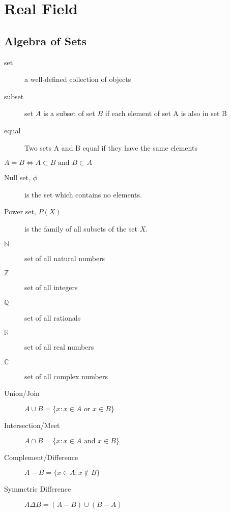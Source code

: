 \chapter{Real Field}
\section{Algebra of Sets}
	\begin{description}
		\item[set] a well-defined collection of objects
		\item[subset] set $A$ is a subset of set $B$ if each element of set A is also in set B
		\item[equal] Two sets A and B equal if they have the same elements
	\end{description}

	\begin{remark}
		$A = B \iff A \subset B \text{ and } B \subset A$
	\end{remark}

	\begin{description}	
		\item[Null set, $\phi$] is the set which contains no elements.
		\item[Power set, $P(X)$] is the family of all subsets of the set $X$.
		\item[$\mathbb{N}$] set of all natural numbers
		\item[$\mathbb{Z}$] set of all integers
		\item[$\mathbb{Q}$] set of all rationals
		\item[$\mathbb{R}$] set of all real numbers
		\item[$\mathbb{C}$] set of all complex numbers
	\end{description}

	\begin{description}
		\item[Union/Join] $A \cup B = \{ x : x \in A \text{ or } x \in B \}$
		\item[Intersection/Meet] $A \cap B = \{ x : x \in A \text{ and } x \in B \}$
		\item[Complement/Difference] $A - B = \{ x \in A : x \not\in B \}$
		\item[Symmetric Difference] $A \Delta B = (A-B) \cup (B-A)$
	\end{description}

